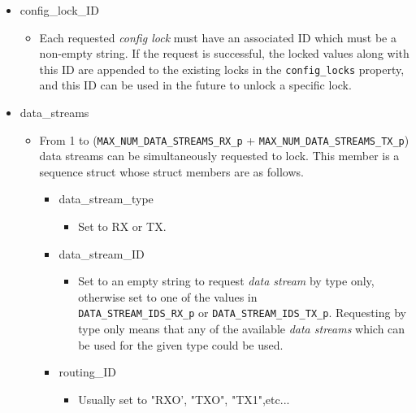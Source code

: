 \documentclass{article}
\begin{document}
  \begin{itemize}
    \item config\_lock\_ID
      \begin{itemize}
        \item Each requested
              \textit{config lock}
              must have an associated ID which must be a
              non-empty string. If the request is successful, the locked values
              along with this ID are appended to the existing locks in the
              \verb+config_locks+ property, and this ID can
              be used in the future to unlock a specific lock.
      \end{itemize}
    \item data\_streams
      \begin{itemize}
        \item From 1 to (\verb+MAX_NUM_DATA_STREAMS_RX_p+ +
              \verb+MAX_NUM_DATA_STREAMS_TX_p+) data
              streams can be simultaneously requested to lock. This member is a
              sequence struct whose struct members are as follows.

          \begin{itemize}
            \item data\_stream\_type
              \begin{itemize}
                \item Set to RX or TX.
              \end{itemize}
            \item data\_stream\_ID
              \begin{itemize}
                \item Set to an empty string to request
                      \textit{data stream} by type only,
                      otherwise set to one of the values in \\
                      \verb+DATA_STREAM_IDS_RX_p+ or \verb+DATA_STREAM_IDS_TX_p+.
                      Requesting by type only means that any of the available
                      \textit{data streams}
                      which can be used for the given type could be used.
              \end{itemize}

            \item routing\_ID
              \begin{itemize}
                \item Usually set to "RXO', "TXO", "TX1",etc...
              \end{itemize}


\end{itemize}
\end{itemize}
\end{itemize}
\end{document}
